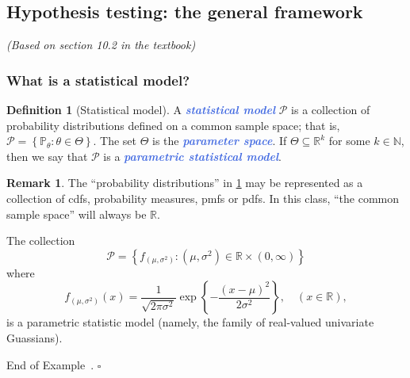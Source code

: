 \documentclass[10pt]{article}
\theoremstyle{definition}
\newtheorem{definition}[theorem]{Definition}
\newtheorem{remark}[theorem]{Remark}
\newtheorem{example}[theorem]{Example}
\renewenvironment{example}
{\begin{oldexample}}
  {\par\smallskip\hfill   End of Example~\theexample. $\square$    \par\end{oldexample}}
\newcommand{\1}[1]{\textbf{1}_{\left[#1\right]}} %
\def\R{\mathbb{R}} %
\def\N{\mathbb{N}} %
\def\P{\mathbb{P}} %
\newcommand{\demph}[1]{\textcolor{RoyalBlue}{\textbf{\slshape #1}}} %
\begin{document}


\subsection{Hypothesis testing: the general framework}
\textit{(Based on section 10.2 in the textbook)}


\subsubsection{What is a statistical model?}
\begin{definition}[Statistical model]
  \label{def:statistical-model}
  A \demph{statistical model} $\mathcal{P}$ is a collection of probability
  distributions defined on a common sample space; that is,
  $\mathcal{P} = \left\{\P_{\theta}:\theta\in \Theta\right\}$. The set
  $\Theta$ is the \demph{parameter space}. If $\Theta\subseteq \R^{k}$ for
  some $k\in \N$, then we say that $\mathcal{P}$ is a \demph{parametric
    statistical model}.
\end{definition}
\begin{remark}
  The ``probability distributions'' in \cref{def:statistical-model} may be
  represented as a collection of cdfs, probability measures, pmfs or pdfs. In
  this class, ``the common sample space'' will always be $\R$.
\end{remark}
\begin{example}
  The collection
  \begin{equation*}
    \mathcal{P}= \left\{f_{(\mu,\sigma^{2})}: (\mu,\sigma^{2})\in \R\times (0,\infty)
    \right\}
  \end{equation*}
  where
  \begin{equation*}
    f_{(\mu,\sigma^{2})}(x) = \frac{1}{\sqrt{2\pi\sigma^{2}}}
    \exp \left\{ -\frac{(x-\mu)^{2}}{2\sigma^{2}}\right\}, \quad (x\in \R),
  \end{equation*}
  is a parametric statistic model (namely, the family of real-valued
  univariate Guassians).
\end{example}
\end{document}
